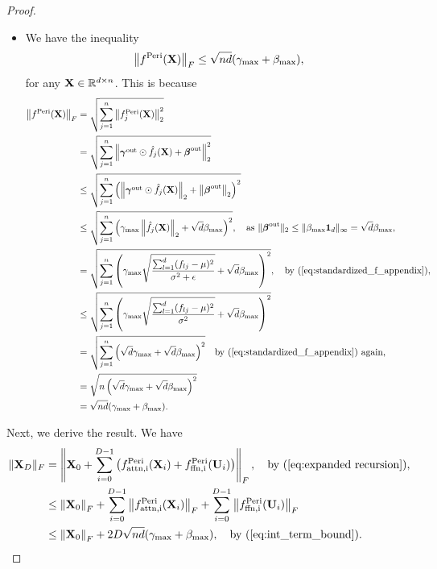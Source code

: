 \documentclass[journal]{IEEEtran}
\newcommand{\bfU}{{\bf U}}
\newcommand{\bfX}{{\bf X}}
\newcommand{\bfgamma}{{\boldsymbol \gamma}}
\newcommand{\bfbeta}{{\boldsymbol \beta}}
\theoremstyle{plain}
\theoremstyle{definition}
\theoremstyle{remark}
\begin{document}
\begin{proof}
\begin{itemize}
\begin{equation}
\end{equation}
and $f_{lj}$ is the $l$th entry of $f_j$.
\item We have the inequality
        \begin{equation}\label{eq:int_term_bound}
        \left\|  f^{\rm Peri}(\bfX) \right\|_F \leq \sqrt{nd} (\gamma_{\rm max} + \beta_{\rm max}),
        \end{equation}
        for any $\bfX \in \mathbb{R}^{d \times n}$. This is because
        \begin{align*}
        \left\|  f^{\rm Peri}(\bfX) \right\|_F & =  \sqrt{\sum_{j=1}^n \left\| f^{\rm Peri}_j(\bfX) \right\|_2^2}\\
            &= \sqrt{\sum_{j=1}^n \left\|  \bfgamma^{\rm out} \odot \hat{f}_j(\bfX) + \bfbeta^{\rm out}\right\|_2^2} \\
            &\leq \sqrt{\sum_{j=1}^n \left( \left\|  \bfgamma^{\rm out} \odot \hat{f}_j(\bfX)\right\|_2 + \left\| \bfbeta^{\rm out}\right\|_2 \right)^2} \\
            &\leq \sqrt{\sum_{j=1}^n \left( \gamma_{\rm max}\left\|  \hat{f}_j(\bfX)\right\|_2 + \sqrt{d} \beta_{\rm max} \right)^2}, \quad \text{as } \|\bfbeta^{\rm out}\|_2 \leq \| \beta_{\rm max} {\bf 1}_d\|_\infty=\sqrt{d}\beta_{\rm max},  \\
            &= \sqrt{ \sum_{j=1}^n \left( \gamma_{\rm max} \sqrt{\frac{\sum_{l=1}^d (f_{lj}-\mu)^2}{\sigma^2+\epsilon}} + \sqrt{d} \beta_{\rm max} \right)^2}, \quad \text{by (\ref{eq:standardized_f_appendix})},\\
            &\leq \sqrt{ \sum_{j=1}^n \left( \gamma_{\rm max} \sqrt{\frac{\sum_{l=1}^d (f_{lj}-\mu)^2}{\sigma^2}} + \sqrt{d} \beta_{\rm max} \right)^2} \\
            &= \sqrt{ \sum_{j=1}^n \left( \sqrt{d} \gamma_{\rm max} + \sqrt{d} \beta_{\rm max} \right)^2} \quad \text{by (\ref{eq:standardized_f_appendix}) again,} \\
            &= \sqrt{ n \left( \sqrt{d} \gamma_{\rm max} + \sqrt{d} \beta_{\rm max} \right)^2} \\
            &= \sqrt{nd} (\gamma_{\rm max} + \beta_{\rm max}).
        \end{align*}
    \end{itemize} 

    Next, we derive the result. We have
    \begin{align}
        \| \bfX_D \|_F 
        &= \left\|  \bfX_{0} + \sum_{i=0}^{D-1} \left( f_{\rm attn, i}^{\rm Peri}(\bfX_{i}) + f_{\rm ffn, i}^{\rm Peri}(\bfU_{i})\right) \right\|_F, \quad \text{by (\ref{eq:expanded recursion})}, \nonumber\\
        & \leq \left\|  \bfX_{0} \right\|_F +  \sum_{i=0}^{D-1} \left\|  f_{\rm attn, i}^{\rm Peri}(\bfX_{i}) \right\|_F + \sum_{i=0}^{D-1} \left\|  f_{\rm ffn, i}^{\rm Peri}(\bfU_{i}) \right\|_F \nonumber \\
        &\leq \left\|  \bfX_{0} \right\|_F + 2D \sqrt{nd} (\gamma_{\rm max} + \beta_{\rm max}), \quad \text{by (\ref{eq:int_term_bound})}. \label{eq:X_D_bound_Fnorm}
    \end{align}


\end{proof}
\end{document}
